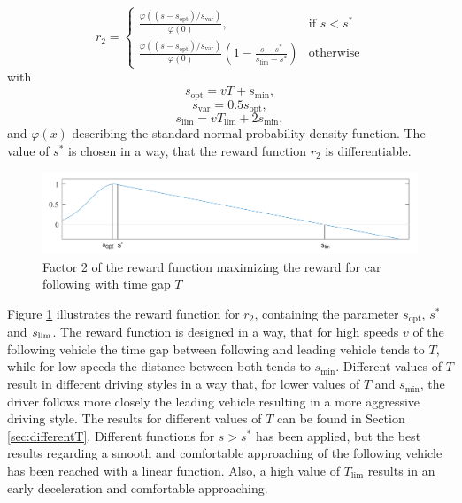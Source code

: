 \documentclass[review]{elsarticle}
\providecommand{\sub}[1]{_{\mathrm{#1}}}  %
\providecommand{\3}{{\ss}}
\begin{document}
\begin{equation}
\label{eq:r1}
r_2  = 
\begin{cases}
\frac{\varphi((s-s\sub{opt})/s\sub{var})}{\varphi(0)},
& \text{if } s < s^*\\
\frac{\varphi((s-s\sub{opt})/s\sub{var})}{\varphi(0)}
\left(1-\frac{s-s^*}{s\sub{lim} - s^*}\right)  & \text{otherwise}
\end{cases}
\end{equation}
with
\begin{equation}
\label{eq:r11}
s\sub{opt} = vT + s\sub{min},
\end{equation}
\begin{equation}
\label{eq:r12}
s\sub{var} = 0.5s\sub{opt},
\end{equation}
\begin{equation}
\label{eq:r13}
s\sub{lim} = vT\sub{lim} + 2s\sub{min},
\end{equation}
%
and $\varphi(x)$ describing the standard-normal probability density
function. The value of $s^*$ is chosen in a way, that the reward function $r_2$ is differentiable.
%
\begin{figure}
	\centering
	\includegraphics[width=12cm]{images/RewardFunc1}
	\caption{Factor 2 of the reward function maximizing the reward
		for car following with time gap $T$} 
	\label{fig:RewardFunc1}
\end{figure}
%
Figure \ref{fig:RewardFunc1} illustrates the reward function for
$r_2$, containing the parameter $s\sub{opt}$, $s^*$ and $s_{\rm
	lim}$. The reward function is designed in a way, that for high speeds $v$
of the following vehicle the time gap between following and leading
vehicle tends to $T$, while for low speeds the distance
between both tends to $s\sub{min}$. Different values of $T$
result in different driving styles in a way that, for lower values of
$T$ and $s\sub{min}$, the driver follows
more closely the leading vehicle resulting in a more aggressive
driving style. The results for different values of $T$ can
be found in Section \ref{sec:differentT}. Different functions for $ s
> s^*$ has been applied, but the best results regarding a smooth and
comfortable approaching of the following vehicle has been reached with
a linear function. Also, a high value of $T\sub{lim}$ results in an
early deceleration and comfortable approaching.
\end{document}
